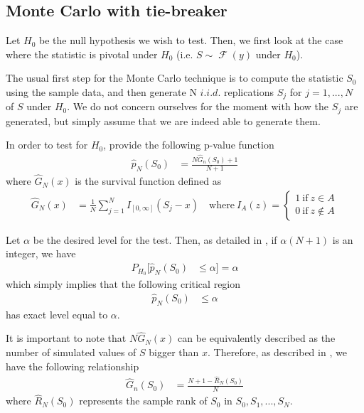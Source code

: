 \documentclass[11pt]{article}\usepackage[]{graphicx}\usepackage[]{color}
\DeclareMathOperator{\dist}{\mathcal{F}}
\begin{document}
\subsection{Monte Carlo with tie-breaker}

Let $H_0$ be the null hypothesis we wish to test. Then, we first look at the case where the statistic is pivotal under $H_0$ (i.e. $S \sim \dist(y)$ under $H_0$).

The usual first step for the Monte Carlo technique is to compute the statistic $S_0$ using the sample data, and then generate $\mathrm{N}$ $i.i.d$. replications $S_{j}$ for $j=1,..., N$ of $S$ under $H_0$. We do not concern ourselves for the moment with how the $S_j$ are generated, but simply assume that we are indeed able to generate them.

In order to test for $H_0$, \cite{dufour_monte_2003} provide the following p-value function
\begin{align}
\hat{p}_{N}(S_{0}) & =\frac{N\hat{G}_{n}(S_{0})+1}{N+1}
\end{align}
where $\hat{G}_{N}(x)$ is the survival function defined as
\begin{align}
	\label{eq:G_N}
	\hat{G}_{N}(x) & =\frac{1}{N}\sum_{j=1}^{N}I_{[0,\infty]}(S_{j}-x) \quad \mathrm{where} \ I_{A}(z)=\left\{\begin{array}{l}
		1\ \mathrm{if}\ z\in A\\
		0\ \mathrm{if}\ z\not\in A
	\end{array}\right.
\end{align}

Let $\alpha$ be the desired level for the test. Then, as detailed in \cite{dufour_monte_2003}, if $\alpha(N+1)$ is an integer, we have
\begin{align}
P_{H_{0}}[\hat{p}_{N}(S_{0}) & \leq\alpha]=\alpha
\end{align}
which simply implies that the following critical region
\begin{align}
	\label{eq:crit}
	\hat{p}_{N}(S_{0}) & \leq\alpha
\end{align}
has exact level equal to $\alpha$.

It is important to note that $N\hat{G}_{N}(x)$ can be equivalently described as the number of simulated values of $S$ bigger than $x$. Therefore, as described in \cite{dufour_monte_2003}, we have the following relationship
\begin{align}
\hat{G}_{n}(S_{0}) &= \frac{N+1-\hat{R}_N(S_0)}{N}
\end{align}
where $\hat{R}_N(S_0)$ represents the sample rank of $S_0$ in $S_0,S_{1},...,S_{N}$.
\end{document}
